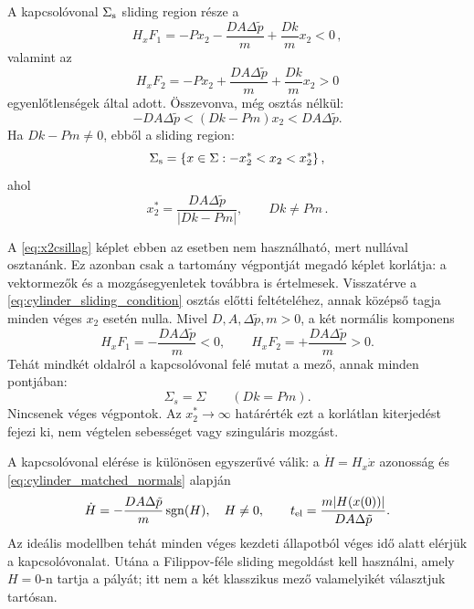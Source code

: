 A kapcsolóvonal $\Sigma_{\rm s}$ sliding region része a
\begin{equation}
H_xF_1 = -P x_2 - \frac{D A \Delta \tilde{p}}{m} + \frac{D k}{m} x_2 < 0 \,,
\end{equation}
\noindent valamint az
\begin{equation}
H_xF_2 = -P x_2 + \frac{D A \Delta \tilde{p}}{m} + \frac{D k}{m} x_2 > 0
\end{equation}
\noindent egyenlőtlenségek által adott. Összevonva, még osztás nélkül:
\begin{equation}\label{eq:cylinder_sliding_condition}
-DA\Delta\tilde p<(Dk-Pm)x_2<DA\Delta\tilde p.
\end{equation}
Ha $Dk-Pm\neq0$, ebből a sliding region:
\begin{equation}
\Sigma_{\rm s} = \{x\in\Sigma: -x_2^* < x_2 < x_2^* \} \,,
\end{equation}
\noindent ahol
\begin{equation} \label{eq:x2csillag}
x_2^* = \frac{D A \Delta \tilde{p}}{|D k - P m|},\qquad Dk\neq Pm\,.
\end{equation}

A \eqref{eq:x2csillag} képlet ebben az esetben nem használható, mert nullával osztanánk. Ez azonban csak a tartomány végpontját megadó képlet korlátja: a vektormezők és a mozgásegyenletek továbbra is értelmesek. Visszatérve a \eqref{eq:cylinder_sliding_condition} osztás előtti feltételéhez, annak középső tagja minden véges $x_2$ esetén nulla. Mivel $D,A,\Delta\tilde p,m>0$, a két normális komponens
\begin{equation}\label{eq:cylinder_matched_normals}
H_xF_1=-\frac{DA\Delta\tilde p}{m}<0,\qquad
H_xF_2=+\frac{DA\Delta\tilde p}{m}>0.
\end{equation}
Tehát mindkét oldalról a kapcsolóvonal felé mutat a mező, annak minden pontjában:
\begin{equation}
\Sigma_s=\Sigma \qquad (Dk=Pm).
\end{equation}
Nincsenek véges végpontok. Az $x_2^*\to\infty$ határérték ezt a korlátlan kiterjedést fejezi ki, nem végtelen sebességet vagy szinguláris mozgást.

A kapcsolóvonal elérése is különösen egyszerűvé válik: a $\dot H=H_x\dot x$ azonosság és \eqref{eq:cylinder_matched_normals} alapján
\begin{equation}
\dot H=-\frac{DA\Delta\tilde p}{m}\operatorname{sgn}(H),\quad H\neq0,
\qquad
 t_{\rm el}=\frac{m|H(x(0))|}{DA\Delta\tilde p}.
\end{equation}
Az ideális modellben tehát minden véges kezdeti állapotból véges idő alatt elérjük a kapcsolóvonalat. Utána a Filippov-féle sliding megoldást kell használni, amely $H=0$-n tartja a pályát; itt nem a két klasszikus mező valamelyikét választjuk tartósan.

